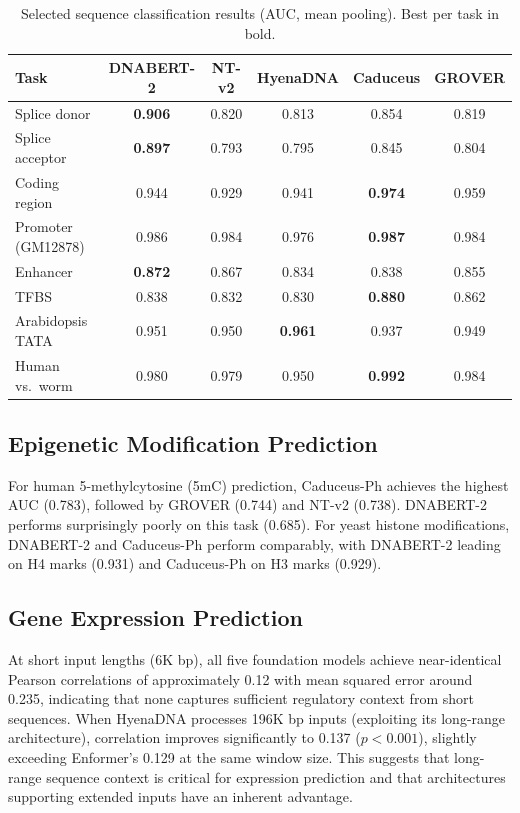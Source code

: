 \documentclass[11pt]{article}
\begin{document}
\begin{table}[h]
\centering
\caption{Selected sequence classification results (AUC, mean pooling). Best per task in bold.}
\label{tab:seqclass}
\begin{tabular}{lccccc}
\toprule
Task & DNABERT-2 & NT-v2 & HyenaDNA & Caduceus & GROVER \\
\midrule
Splice donor & \textbf{0.906} & 0.820 & 0.813 & 0.854 & 0.819 \\
Splice acceptor & \textbf{0.897} & 0.793 & 0.795 & 0.845 & 0.804 \\
Coding region & 0.944 & 0.929 & 0.941 & \textbf{0.974} & 0.959 \\
Promoter (GM12878) & 0.986 & 0.984 & 0.976 & \textbf{0.987} & 0.984 \\
Enhancer & \textbf{0.872} & 0.867 & 0.834 & 0.838 & 0.855 \\
TFBS & 0.838 & 0.832 & 0.830 & \textbf{0.880} & 0.862 \\
Arabidopsis TATA & 0.951 & 0.950 & \textbf{0.961} & 0.937 & 0.949 \\
Human vs.\ worm & 0.980 & 0.979 & 0.950 & \textbf{0.992} & 0.984 \\
\bottomrule
\end{tabular}
\end{table}

\subsection{Epigenetic Modification Prediction}

For human 5-methylcytosine (5mC) prediction, Caduceus-Ph achieves the highest AUC (0.783), followed by GROVER (0.744) and NT-v2 (0.738). DNABERT-2 performs surprisingly poorly on this task (0.685). For yeast histone modifications, DNABERT-2 and Caduceus-Ph perform comparably, with DNABERT-2 leading on H4 marks (0.931) and Caduceus-Ph on H3 marks (0.929).

\subsection{Gene Expression Prediction}

At short input lengths (6K bp), all five foundation models achieve near-identical Pearson correlations of approximately 0.12 with mean squared error around 0.235, indicating that none captures sufficient regulatory context from short sequences. When HyenaDNA processes 196K bp inputs (exploiting its long-range architecture), correlation improves significantly to 0.137 ($p < 0.001$), slightly exceeding Enformer's 0.129 at the same window size. This suggests that long-range sequence context is critical for expression prediction and that architectures supporting extended inputs have an inherent advantage.
\end{document}
